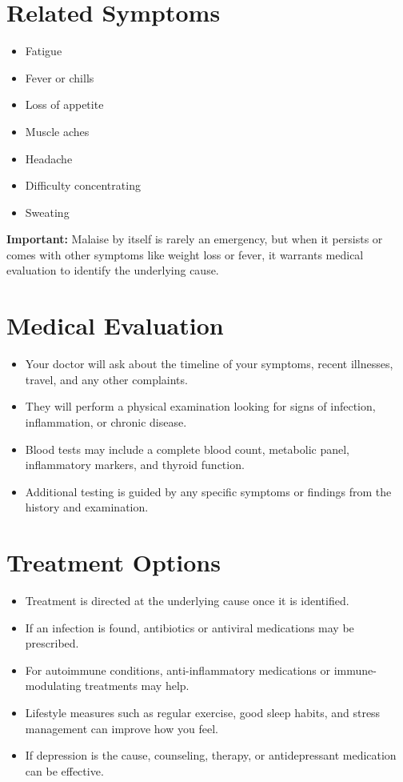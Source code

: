 \section*{Related Symptoms}
\begin{itemize}
  \item Fatigue
  \item Fever or chills
  \item Loss of appetite
  \item Muscle aches
  \item Headache
  \item Difficulty concentrating
  \item Sweating
\end{itemize}
\textbf{Important:} Malaise by itself is rarely an emergency, but when it persists or comes with other symptoms like weight loss or fever, it warrants medical evaluation to identify the underlying cause.

\section*{Medical Evaluation}
\begin{itemize}
  \item Your doctor will ask about the timeline of your symptoms, recent illnesses, travel, and any other complaints.
  \item They will perform a physical examination looking for signs of infection, inflammation, or chronic disease.
  \item Blood tests may include a complete blood count, metabolic panel, inflammatory markers, and thyroid function.
  \item Additional testing is guided by any specific symptoms or findings from the history and examination.
\end{itemize}

\section*{Treatment Options}
\begin{itemize}
  \item Treatment is directed at the underlying cause once it is identified.
  \item If an infection is found, antibiotics or antiviral medications may be prescribed.
  \item For autoimmune conditions, anti-inflammatory medications or immune-modulating treatments may help.
  \item Lifestyle measures such as regular exercise, good sleep habits, and stress management can improve how you feel.
  \item If depression is the cause, counseling, therapy, or antidepressant medication can be effective.
\end{itemize}

